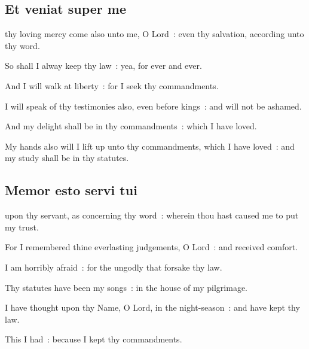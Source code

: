 \subsection{Et veniat super me}
 thy loving mercy come also unto me, O Lord~: even thy salvation, according unto thy word.\par
{}
So shall I alway keep thy law~: yea, for ever and ever.\par
{}And I will walk at liberty~: for I seek thy commandments.\par
{}I will speak of thy testimonies also, even before kings~: and will not be ashamed.\par
{}And my delight shall be in thy commandments~: which I have loved.\par
{}My hands also will I lift up unto thy commandments, which I have loved~: and my study shall be in thy statutes.\par

\subsection{Memor esto servi tui}
 upon thy servant, as concerning thy word~: wherein thou hast caused me to put my trust.\par
{}
For I remembered thine everlasting judgements, O Lord~: and received comfort.\par
{}I am horribly afraid~: for the ungodly that forsake thy law.\par
{}Thy statutes have been my songs~: in the house of my pilgrimage.\par
{}I have thought upon thy Name, O Lord, in the night-season~: and have kept thy law.\par
{}This I had~: because I kept thy commandments.\par

